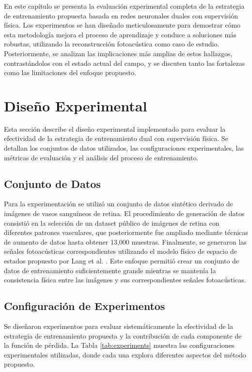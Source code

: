 
En este capítulo se presenta la evaluación experimental completa de la estrategia de entrenamiento propuesta basada en redes neuronales duales con supervisión física. Los experimentos se han diseñado meticulosamente para demostrar cómo esta metodología mejora el proceso de aprendizaje y conduce a soluciones más robustas, utilizando la reconstrucción fotoacústica como caso de estudio. Posteriormente, se analizan las implicaciones más amplias de estos hallazgos, contrastándolos con el estado actual del campo, y se discuten tanto las fortalezas como las limitaciones del enfoque propuesto.

\section{Diseño Experimental}

Esta sección describe el diseño experimental implementado para evaluar la efectividad de la estrategia de entrenamiento dual con supervisión física. Se detallan los conjuntos de datos utilizados, las configuraciones experimentales, las métricas de evaluación y el análisis del proceso de entrenamiento.

\subsection{Conjunto de Datos}

Para la experimentación se utilizó un conjunto de datos sintético derivado de imágenes de vasos sanguíneos de retina. El procedimiento de generación de datos consistió en la selección de un dataset público de imágenes de retina con diferentes patrones vasculares, que posteriormente fue ampliado mediante técnicas de aumento de datos hasta obtener 13,000 muestras. Finalmente, se generaron las señales fotoacústicas correspondientes utilizando el modelo físico de espacio de estados propuesto por Lang et al. \cite{Lang2017}. Este enfoque permitió crear un conjunto de datos de entrenamiento suficientemente grande mientras se mantenía la consistencia física entre las imágenes y sus correspondientes señales fotoacústicas.

\subsection{Configuración de Experimentos}

Se diseñaron experimentos para evaluar sistemáticamente la efectividad de la estrategia de entrenamiento propuesta y la contribución de cada componente de la función de pérdida. La Tabla \ref{tab:experiments} muestra las configuraciones experimentales utilizadas, donde cada una explora diferentes aspectos del método propuesto.

